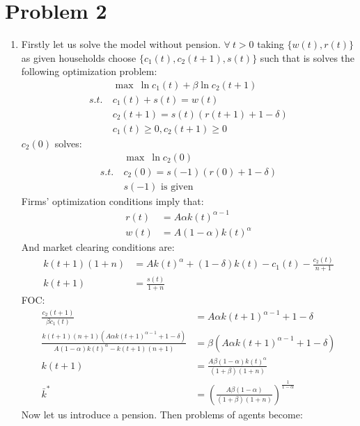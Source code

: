 \documentclass[a4paper]{article}
\begin{document}
\section*{Problem 2}
\begin{enumerate}
	\item Firstly let us solve the model without pension.
	$\forall\ t > 0$ taking $\{w(t), r(t)\}$ as given households choose $\{c_1(t), c_2(t+1), s(t)\}$ such that is solves the following optimization problem:
	\begin{align*}
	&\max\ \ln c_1(t) + \beta \ln c_2(t+1)\\
	s.t.\ &c_1(t) +s(t) = w(t)\\
	& c_2(t+1) = s(t)(r(t+1) + 1 - \delta)\\
	&c_1(t) \ge 0, c_2(t+1) \ge 0
	\end{align*}
	$c_2(0)$ solves:
	\begin{align*}
	&\max\ \ln c_2(0)\\
	s.t.\ &c_2(0) = s(-1)(r(0) + 1 - \delta)\\
	&s(-1) \text{ is given }
	\end{align*}
	Firms' optimization conditions imply that:
	\begin{align*}
	r(t) &= A\alpha k(t)^{\alpha - 1}\\
	w(t) &= A(1 - \alpha) k(t)^{\alpha}
	\end{align*}
	And market clearing conditions are:
	\begin{align*}
	k(t+1)(1+n) &= Ak(t)^{\alpha} + (1-\delta)k(t) - c_1(t) - \frac{c_2(t)}{n+1}\\
	k(t+1) &= \frac{s(t)}{1+n}
	\end{align*}
	FOC:
	\begin{align*}
	\frac{c_2(t+1)}{\beta c_1(t)} &= A\alpha k(t+1)^{\alpha-1} + 1 - \delta\\
	\frac{k(t+1)(n+1)(A\alpha k(t+1)^{\alpha - 1} + 1 -\delta)}{A(1 - \alpha) k(t)^{\alpha} - k(t+1)(n+1)} &= \beta(A\alpha k(t+1)^{\alpha-1} + 1 - \delta)\\
	k(t+1) &= \frac{A\beta (1-\alpha)k(t)^{\alpha}}{(1+\beta)(1+n)}\\
	\bar{k}^* &= \left(\frac{A\beta (1-\alpha)}{(1+\beta)(1+n)}\right)^{\frac{1}{1 - \alpha}}
	\end{align*}
	Now let us introduce a pension. Then problems of agents become:
	

\end{enumerate}
\end{document}
